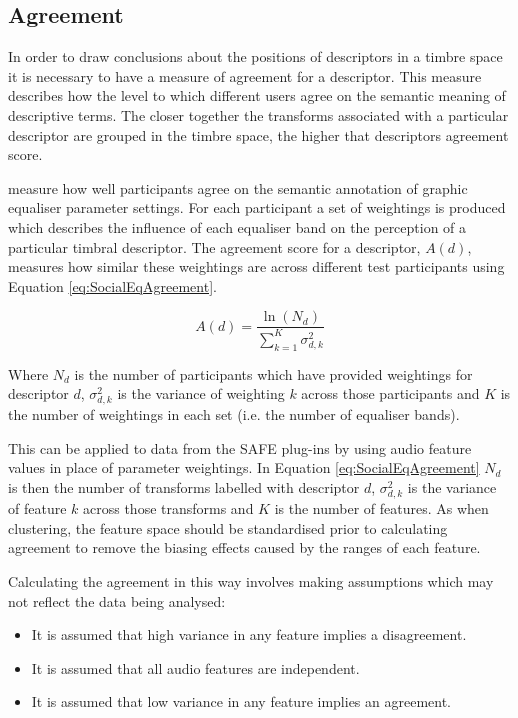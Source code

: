 	\subsection{Agreement}
	\label{sec:TimbreEvaluation-Analysis-Agreement}
		In order to draw conclusions about the positions of descriptors in a timbre space it is necessary to have a
		measure of agreement for a descriptor. This measure describes how the level to which different users agree
		on the semantic meaning of descriptive terms. The closer together the transforms associated with a
		particular descriptor are grouped in the timbre space, the higher that descriptors agreement score.

		\citet{cartwright2013socialeq} measure how well participants agree on the semantic annotation of graphic
		equaliser parameter settings. For each participant a set of weightings is produced which describes the
		influence of each equaliser band on the perception of a particular timbral descriptor. The agreement score
		for a descriptor, $A(d)$, measures how similar these weightings are across different test participants using
		Equation \ref{eq:SocialEqAgreement}.

		\begin{equation}
			A(d) = \frac{\ln(N_{d})}{\sum_{k = 1}^{K} \sigma_{d,k}^{2}}
			\label{eq:SocialEqAgreement}
		\end{equation}

		Where $N_{d}$ is the number of participants which have provided weightings for descriptor $d$,
		$\sigma_{d,k}^{2}$ is the variance of weighting $k$ across those participants and $K$ is the number of
		weightings in each set (i.e. the number of equaliser bands).


		This can be applied to data from the SAFE plug-ins by using audio feature values in place of parameter
		weightings. In Equation \ref{eq:SocialEqAgreement} $N_{d}$ is then the number of transforms labelled with
		descriptor $d$, $\sigma_{d,k}^{2}$ is the variance of feature $k$ across those transforms and $K$ is the
		number of features. As when clustering, the feature space should be standardised prior to calculating
		agreement to remove the biasing effects caused by the ranges of each feature.

		Calculating the agreement in this way involves making assumptions which may not reflect the data being
		analysed:

		\begin{itemize}
			\item It is assumed that high variance in any feature implies a disagreement. 
			\item It is assumed that all audio features are independent. 
			\item It is assumed that low variance in any feature implies an agreement. 
		\end{itemize}

